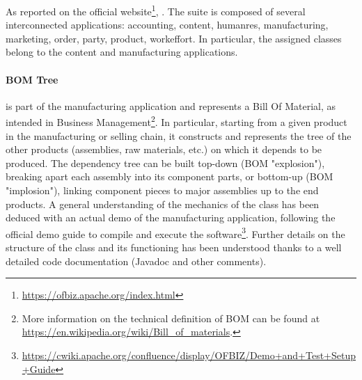 As reported on the official website\footnote{\url{https://ofbiz.apache.org/index.html}}, .\newline
The suite is composed of several interconnected applications:
accounting,
content,
humanres,
manufacturing,
marketing,
order,
party,
product,
workeffort.\newline
In particular, the assigned classes belong to the content and manufacturing applications.

\paragraph{BOM Tree} is part of the manufacturing application and represents a Bill Of Material, as intended in Business Management\footnote{More information on the technical definition of BOM can be found at \url{https://en.wikipedia.org/wiki/Bill_of_materials}.}. In particular, starting from a given product in the manufacturing or selling chain, it constructs and represents the tree of the other products (assemblies, raw materials, etc.) on which it depends to be produced. The dependency tree can be built top-down (BOM "explosion"), breaking apart each assembly into its component parts, or bottom-up (BOM "implosion"), linking component pieces to major assemblies up to the end products.\newline
A general understanding of the mechanics of the class has been deduced with an actual demo of the manufacturing application, following the official demo guide to compile and execute the software\footnote{\url{https://cwiki.apache.org/confluence/display/OFBIZ/Demo+and+Test+Setup+Guide}}. Further details on the structure of the class and its functioning has been understood thanks to a well detailed code documentation (Javadoc and other comments).

